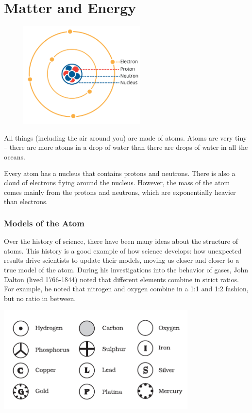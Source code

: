 \chapter{Matter and Energy}

\begin{figure}
\noindent\includegraphics[trim={0 5cm 0 0}, width=2.5in]{atom1.png}
\end{figure}

All things (including the air around you) are made of atoms. Atoms are
very tiny -- there are more atoms in a drop of water than there are
drops of water in all the oceans.


Every atom has a nucleus that contains protons and neutrons. There is also
a cloud of electrons flying around the nucleus. However, the mass of the atom
comes mainly from the protons and neutrons, which are exponentially heavier
than electrons.  


\subsection{Models of the Atom}
Over the history of science, there have been many ideas about the structure of
atoms. This history is a good example of how science develops: how unexpected
results drive scientists to update their models, moving us closer and closer to
a true model of the atom. During his investigations into the behavior of gases,
John Dalton (lived 1766-1844) noted that different elements combine in strict
ratios. For example, he noted that nitrogen and oxygen combine in a 1:1 and 1:2
fashion, but no ratio in between.

\includegraphics[width=0.75\textwidth]{daltons_model.png}

